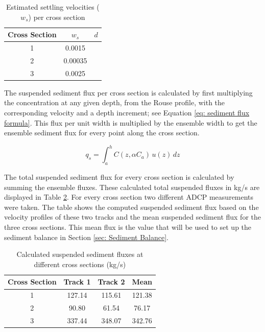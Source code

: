 \begin{table}[H]
    \centering
    \caption{Estimated settling velocities ($w_s$) per cross section}
    \label{tab: Overview settling velocity}
    \setlength{\tabcolsep}{8pt}
    \begin{tabular}{c c c}
        \hline
        Cross Section & $w_s$ & $d$  \\
        \hline
        1 & 0.0015 &  \\
        2 & 0.00035  &   \\
        3 & 0.0025 &  \\
        \hline
    \end{tabular}
\end{table}

The suspended sediment flux per cross section is calculated by first multiplying the concentration at any given depth, from the Rouse profile, with the corresponding velocity and a depth increment; see Equation \ref{eq: sediment flux formula}. This flux per unit width is multiplied by the ensemble width to get the ensemble sediment flux for every point along the cross section. 

\begin{equation}
    q_{s} = \int_{a}^{h} C(z, \alpha C_a) \, u(z) \, dz
    \label{eq: sediment flux formula}
\end{equation}

The total suspended sediment flux for every cross section is calculated by summing the ensemble fluxes. These calculated total suspended fluxes in kg/s are displayed in Table \ref{tab:Calculated suspended sediment flux}. For every cross section two different ADCP measurements were taken. The table shows the computed suspended sediment flux based on the velocity profiles of these two tracks and the mean suspended sediment flux for the three cross sections. This mean flux is the value that will be used to set up the sediment balance in Section \ref{sec: Sediment Balance}. 
 
\begin{table}[H]
    \centering
    \caption{Calculated suspended sediment fluxes at different cross sections (kg/s)}
    \label{tab:Calculated suspended sediment flux}
    \setlength{\tabcolsep}{8pt}
    \begin{tabular}{c c c c}
        \hline
        Cross Section & Track 1 & Track 2 & Mean\\
        \hline
        1 & 127.14 & 115.61 & 121.38\\
        2 & 90.80  & 61.54  & 76.17\\
        3 & 337.44 & 348.07 & 342.76\\
        \hline
    \end{tabular}
\end{table}

